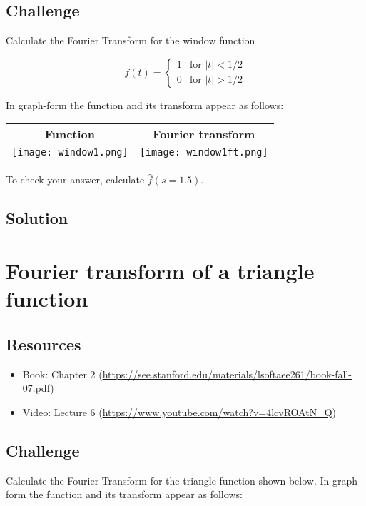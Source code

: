\subsection*{Challenge}
Calculate the Fourier Transform for the window function

\begin{equation}
    f(t)=
    \begin{cases}
        1 & \text{for } |t| < 1/2 \\
        0 & \text{for } |t| > 1/2
    \end{cases}
\end{equation}

In graph-form the function and its transform appear as follows:

\begin{tabular}{cc}
    \textbf{Function} & \textbf{Fourier transform} \\
    \texttt{[image: window1.png]} & \texttt{[image: window1ft.png]}
\end{tabular}

To check your answer, calculate $\hat{f}(s=1.5)$.

\subsection*{Solution}

\timebox




\newpage
\section{Fourier transform of a triangle function}

\subsection*{Resources}
\begin{itemize}
    \item Book: Chapter 2 (\url{https://see.stanford.edu/materials/lsoftaee261/book-fall-07.pdf})
    \item Video: Lecture 6 (\url{https://www.youtube.com/watch?v=4lcvROAtN_Q})
\end{itemize}

\subsection*{Challenge}
Calculate the Fourier Transform for the triangle function shown below. In graph-form the function and its transform appear as follows:


